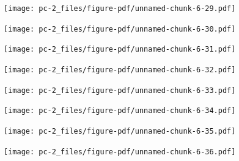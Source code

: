 \documentclass[
  letterpaper,
  DIV=11,
  numbers=noendperiod]{scrreprt}
\begin{document}
\begin{figure}[H]

{\centering \texttt{[image: pc-2\_files/figure-pdf/unnamed-chunk-6-29.pdf]}

}

\end{figure}

\begin{figure}[H]

{\centering \texttt{[image: pc-2\_files/figure-pdf/unnamed-chunk-6-30.pdf]}

}

\end{figure}

\begin{figure}[H]

{\centering \texttt{[image: pc-2\_files/figure-pdf/unnamed-chunk-6-31.pdf]}

}

\end{figure}

\begin{figure}[H]

{\centering \texttt{[image: pc-2\_files/figure-pdf/unnamed-chunk-6-32.pdf]}

}

\end{figure}

\begin{figure}[H]

{\centering \texttt{[image: pc-2\_files/figure-pdf/unnamed-chunk-6-33.pdf]}

}

\end{figure}

\begin{figure}[H]

{\centering \texttt{[image: pc-2\_files/figure-pdf/unnamed-chunk-6-34.pdf]}

}

\end{figure}

\begin{figure}[H]

{\centering \texttt{[image: pc-2\_files/figure-pdf/unnamed-chunk-6-35.pdf]}

}

\end{figure}

\begin{figure}[H]

{\centering \texttt{[image: pc-2\_files/figure-pdf/unnamed-chunk-6-36.pdf]}

}

\end{figure}
\end{document}
